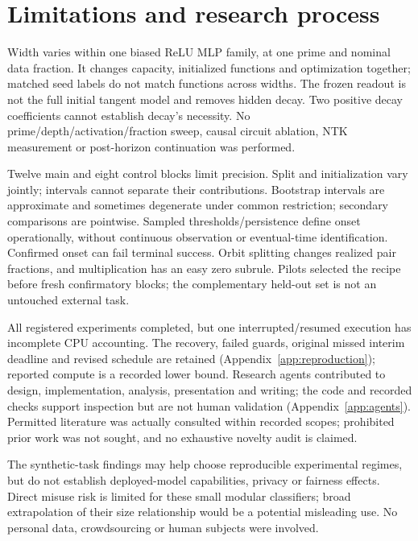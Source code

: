 \section{Limitations and research process}
\label{sec:limitations}
Width varies within one biased ReLU MLP family, at one prime and nominal data fraction. It changes capacity, initialized functions and optimization together; matched seed labels do not match functions across widths. The frozen readout is not the full initial tangent model and removes hidden decay. Two positive decay coefficients cannot establish decay's necessity. No prime/depth/activation/fraction sweep, causal circuit ablation, NTK measurement or post-horizon continuation was performed.

Twelve main and eight control blocks limit precision. Split and initialization vary jointly; intervals cannot separate their contributions. Bootstrap intervals are approximate and sometimes degenerate under common restriction; secondary comparisons are pointwise. Sampled thresholds/persistence define onset operationally, without continuous observation or eventual-time identification. Confirmed onset can fail terminal success. Orbit splitting changes realized pair fractions, and multiplication has an easy zero subrule. Pilots selected the recipe before fresh confirmatory blocks; the complementary held-out set is not an untouched external task.

All registered experiments completed, but one interrupted/resumed execution has incomplete CPU accounting. The recovery, failed guards, original missed interim deadline and revised schedule are retained (Appendix~\ref{app:reproduction}); reported compute is a recorded lower bound. Research agents contributed to design, implementation, analysis, presentation and writing; the code and recorded checks support inspection but are not human validation (Appendix~\ref{app:agents}). Permitted literature was actually consulted within recorded scopes; prohibited prior work was not sought, and no exhaustive novelty audit is claimed.

The synthetic-task findings may help choose reproducible experimental regimes, but do not establish deployed-model capabilities, privacy or fairness effects. Direct misuse risk is limited for these small modular classifiers; broad extrapolation of their size relationship would be a potential misleading use. No personal data, crowdsourcing or human subjects were involved.
